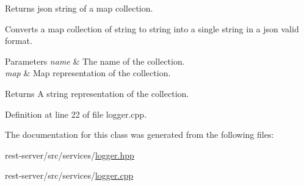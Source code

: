 Returns json string of a map collection. 

Converts a map collection of string to string into a single string in a json valid format. 
\begin{DoxyParams}{Parameters}
{\em name} & The name of the collection. \\
\hline
{\em map} & Map representation of the collection. \\
\hline
\end{DoxyParams}
\begin{DoxyReturn}{Returns}
A string representation of the collection. 
\end{DoxyReturn}


Definition at line 22 of file logger.\+cpp.



The documentation for this class was generated from the following files\+:\begin{DoxyCompactItemize}
\item 
rest-\/server/src/services/\mbox{\hyperlink{logger_8hpp}{logger.\+hpp}}\item 
rest-\/server/src/services/\mbox{\hyperlink{logger_8cpp}{logger.\+cpp}}\end{DoxyCompactItemize}
